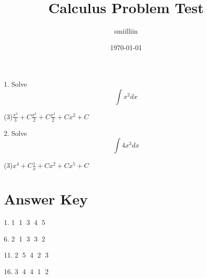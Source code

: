 \documentclass{article}
\title{Calculus Problem Test}
\author{smiilliin}
\date{\today}
\begin{document}
\maketitle\begin{multicols*}{2}
\noindent
\begin{minipage}{\linewidth}
1. Solve \[ \int x^2 dx \]\begin{tasks}[label=\textcircled{\scriptsize\arabic*},label-width=13pt](3)\task \( \frac{x^3}{3} + C \)\task \( \frac{x^2}{2} + C \)\task \( \frac{x^3}{2} + C \)\task \( x^2 + C \)\end{tasks}
\end{minipage}
\bigskip

\noindent
\begin{minipage}{\linewidth}
2. Solve \[ \int 4x^3 dx \]\begin{tasks}[label=\textcircled{\scriptsize\arabic*},label-width=13pt](3)\task \( {x^4} + C \)\task \( \frac{1}{x} + C \)\task \( {x^2} + C \)\task \( x^5 + C \)\end{tasks}
\end{minipage}
\bigskip

\newpage
\section*{Answer Key}
\noindent\begin{minipage}{\linewidth}

1. \textcircled{1} \textcircled{1} \textcircled{3} \textcircled{4} \textcircled{5} 
\end{minipage}

\noindent\begin{minipage}{\linewidth}

6. \textcircled{2} \textcircled{1} \textcircled{3} \textcircled{3} \textcircled{2} 
\end{minipage}

\noindent\begin{minipage}{\linewidth}

11. \textcircled{2} \textcircled{5} \textcircled{4} \textcircled{2} \textcircled{3} 
\end{minipage}

\noindent\begin{minipage}{\linewidth}

16. \textcircled{3} \textcircled{4} \textcircled{4} \textcircled{1} \textcircled{2} 

\end{minipage}\end{multicols*}
\end{document}
